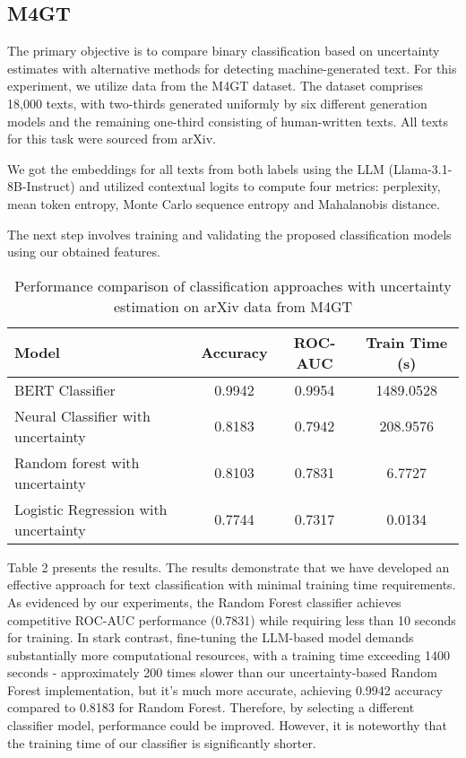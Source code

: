 \documentclass[a4paper, 12pt]{article}
\begin{document}
\subsection{M4GT}

The primary objective is to compare binary classification based on uncertainty estimates with alternative methods for detecting machine-generated text. For this experiment, we utilize data from the M4GT dataset. The dataset comprises 18,000 texts, with two-thirds generated uniformly by six different generation models and the remaining one-third consisting of human-written texts. All texts for this task were sourced from arXiv.

We got the embeddings for all texts from both labels using the LLM (Llama-3.1-8B-Instruct) and utilized contextual logits to compute four metrics: perplexity, mean token entropy, Monte Carlo sequence entropy and Mahalanobis distance.

The next step involves training and validating the proposed classification models using our obtained features.

\begin{table}[ht]
\centering
\begin{tabular}{|l|c|c|c|}
\hline
\textbf{Model} & \textbf{Accuracy} & \textbf{ROC-AUC} & \textbf{Train Time (s)} \\
\hline
BERT Classifier & 0.9942 & 0.9954 & 1489.0528 \\
Neural Classifier with uncertainty & 0.8183 & 0.7942 & 208.9576 \\
Random forest with uncertainty & 0.8103 & 0.7831 & 6.7727 \\
Logistic Regression with uncertainty & 0.7744 & 0.7317 & 0.0134 \\
\hline
\end{tabular}
\caption{Performance comparison of classification approaches with uncertainty estimation on arXiv data from M4GT}
\label{tab:model-performance}
\end{table}

Table 2 presents the results. The results demonstrate that we have developed an effective approach for text classification with minimal training time requirements. As evidenced by our experiments, the Random Forest classifier achieves competitive ROC-AUC performance (0.7831) while requiring less than 10 seconds for training. In stark contrast, fine-tuning the LLM-based model demands substantially more computational resources, with a training time exceeding 1400 seconds - approximately 200 times slower than our uncertainty-based Random Forest implementation, but it’s much more accurate, achieving  0.9942 accuracy compared to 0.8183 for Random Forest. Therefore, by selecting a different classifier model, performance could be improved. However, it is noteworthy that the training time of our classifier is significantly shorter.
\end{document}
